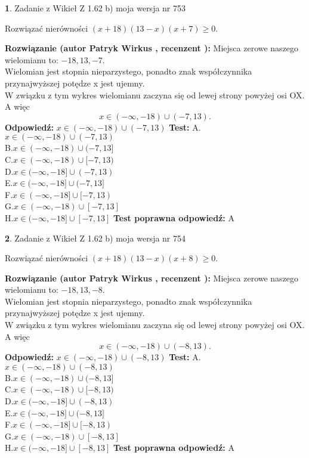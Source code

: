 \documentclass[12pt, a4paper]{article}
\theoremstyle{definition} %
\newtheorem{zad}{}
\newcommand{\zadStart}[1]{\begin{zad}#1\newline}
\newcommand{\zadStop}{\end{zad}}
\newcommand{\rozwStart}[2]{\noindent \textbf{Rozwiązanie (autor #1 , recenzent #2): }\newline}
\newcommand{\rozwStop}{\newline}
\newcommand{\odpStart}{\noindent \textbf{Odpowiedź:}\newline}
\newcommand{\odpStop}{\newline}
\newcommand{\testStart}{\noindent \textbf{Test:}\newline}
\newcommand{\testStop}{\newline}
\newcommand{\kluczStart}{\noindent \textbf{Test poprawna odpowiedź:}\newline}
\newcommand{\kluczStop}{\newline}
\begin{document}
\zadStart{Zadanie z Wikieł Z 1.62 b) moja wersja nr 753}

Rozwiązać nierówności $(x+18)(13-x)(x+7)\ge0$.
\zadStop
\rozwStart{Patryk Wirkus}{}
Miejsca zerowe naszego wielomianu to: $-18, 13, -7$.\\
Wielomian jest stopnia nieparzystego, ponadto znak współczynnika przy\linebreak najwyższej potędze x jest ujemny.\\ W związku z tym wykres wielomianu zaczyna się od lewej strony powyżej osi OX. A więc $$x \in (-\infty,-18) \cup (-7,13).$$
\rozwStop
\odpStart
$x \in (-\infty,-18) \cup (-7,13)$
\odpStop
\testStart
A.$x \in (-\infty,-18) \cup (-7,13)$\\
B.$x \in (-\infty,-18) \cup (-7,13]$\\
C.$x \in (-\infty,-18) \cup [-7,13)$\\
D.$x \in (-\infty,-18] \cup (-7,13)$\\
E.$x \in (-\infty,-18] \cup (-7,13]$\\
F.$x \in (-\infty,-18] \cup [-7,13)$\\
G.$x \in (-\infty,-18) \cup [-7,13]$\\
H.$x \in (-\infty,-18] \cup [-7,13]$
\testStop
\kluczStart
A
\kluczStop



\zadStart{Zadanie z Wikieł Z 1.62 b) moja wersja nr 754}

Rozwiązać nierówności $(x+18)(13-x)(x+8)\ge0$.
\zadStop
\rozwStart{Patryk Wirkus}{}
Miejsca zerowe naszego wielomianu to: $-18, 13, -8$.\\
Wielomian jest stopnia nieparzystego, ponadto znak współczynnika przy\linebreak najwyższej potędze x jest ujemny.\\ W związku z tym wykres wielomianu zaczyna się od lewej strony powyżej osi OX. A więc $$x \in (-\infty,-18) \cup (-8,13).$$
\rozwStop
\odpStart
$x \in (-\infty,-18) \cup (-8,13)$
\odpStop
\testStart
A.$x \in (-\infty,-18) \cup (-8,13)$\\
B.$x \in (-\infty,-18) \cup (-8,13]$\\
C.$x \in (-\infty,-18) \cup [-8,13)$\\
D.$x \in (-\infty,-18] \cup (-8,13)$\\
E.$x \in (-\infty,-18] \cup (-8,13]$\\
F.$x \in (-\infty,-18] \cup [-8,13)$\\
G.$x \in (-\infty,-18) \cup [-8,13]$\\
H.$x \in (-\infty,-18] \cup [-8,13]$
\testStop
\kluczStart
A
\kluczStop
\end{document}
